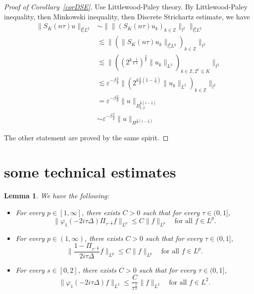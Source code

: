 \documentclass[10pt,a4paper]{article}
\newtheorem{lemma}[theorem]{Lemma}
\begin{document}
  \begin{proof}[Proof of Corollary~\ref{corDSE}]
    Use Littlewood-Paley theory.
    By Littlewood-Paley inequality, then Minkowski inequality, then Discrete
    Strichartz estimate, we have
    \begin{equation}
      \begin{aligned}
        \|S_K(n\tau)u\|_{l^p_\tau L^q} & \sim \|\|(S_K(n\tau) u_k)_{k\in \mathbb{Z}}\|_{l^2}\|_{l^p_\tau L^q} \\
        &\lesssim \|(\|S_K(n\tau) u_k\|_{l^p_\tau L^q})_{k\in \mathbb{Z}}\|_{l^2} \\
        &\lesssim \|((2^k\tau^\frac12)^\frac2p \|u_k\|_{L^2})_{k\in \mathbb{Z}, 2^k \lesssim K}\|_{l^2} \\
        &\lesssim \varepsilon^{-\beta\frac2p}\|(2^{k\frac2p(1-\frac1\gamma)} \|u_k\|_{L^2})_{k\in \mathbb{Z}}\|_{l^2} \\
        &= \varepsilon^{-\beta\frac2p}\|u\|_{B^{\frac2p(1-\frac1\gamma)}_{2,2}} \\
        &\sim \varepsilon^{-\beta\frac2p}\|u\|_{H^{\frac2p(1-\frac1\gamma)}}
      \end{aligned}
    \end{equation}

    The other statement are proved by the same spirit.
  \end{proof}


  \section{some technical estimates}

  \begin{lemma}\label{lemfilter1}
    We have the following:
    \begin{itemize}
      \item For every \(p \in [1,\infty]\), there exists \(C>0\) such that for every
        \(\tau \in (0,1]\),
        \begin{equation}\label{101}
          \|\varphi_1(-2i\tau\Delta)\Pi_{\tau^{-\frac12}} f\|_{L^p} \leq
          C\|f\|_{L^p} \quad\text{for all } f \in L^p.
        \end{equation}
      \item For every \(p \in (1,\infty)\), there exists \(C>0\) such that for every
        \(\tau \in (0,1]\),
        \begin{equation}\label{102}
          \|\frac{1-\Pi_{\tau^{-\frac12}}}{2i\tau\Delta} f\|_{L^p} \leq
          C\|f\|_{L^p} \quad\text{for all } f \in L^p.
        \end{equation}
      \item For every \(s \in [0,2]\), there exists \(C>0\) such that for every
        \(\tau \in (0,1]\),
        \begin{equation}\label{103}
          \|\varphi_1(-2i\tau\Delta) f\|_{L^2} \leq
          \frac C{\tau^\frac s2}\|f\|_{L^2} \quad\text{for all } f \in L^2.
        \end{equation}
    \end{itemize}
  \end{lemma}
\end{document}
